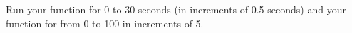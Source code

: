 {Run your  function for  0 to 30 seconds (in increments of 0.5 seconds) and your function  for  from 0 to 100 in increments of 5.}
{}